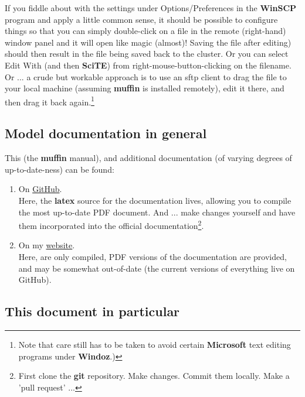 \documentclass[11pt,fleqn]{book} %
\begin{document}
If you fiddle about with the settings under Options/Preferences in the \textbf{WinSCP} program and apply a little common sense, it should be possible to configure things so that you can simply double-click on a file in the remote (right-hand) window panel and it will open like magic (almost)! Saving the file after editing) should then result in the file being saved back to the cluster. Or you can select Edit With (and then \textbf{SciTE}) from right-mouse-button-clicking on the filename. Or ... a crude but workable approach is to use an sftp client to drag the file to your local machine (assuming \textbf{muffin} is installed remotely), edit it there, and then drag it back again.\footnote{Note that care still has to be taken to avoid certain \textbf{Microsoft} text editing programs under \textbf{Windoz}.)}


\subsection*{Model documentation in general}

This (the \textbf{muffin} manual), and additional documentation (of varying degrees of up-to-date-ness) can be found:

\begin{enumerate}[noitemsep]
\setlength{\itemindent}{.2in}
\item On \href{https://github.com/derpycode/muffindoc}{GitHub}.
\\Here, the \textbf{latex} source for the documentation lives, allowing you to compile the most up-to-date PDF document. And ... make changes yourself and have them incorporated into the official documentation\footnote{First clone the \textbf{git} repository. Make changes. Commit them locally. Make a 'pull request' ...}.
\item On my \href{http://www.seao2.info/mymuffin.html}{website}.
\\Here, are only compiled, PDF versions of the documentation are provided, and may be somewhat out-of-date (the current versions of everything live on GitHub).
\end{enumerate}


\subsection*{This document in particular}
\end{document}
